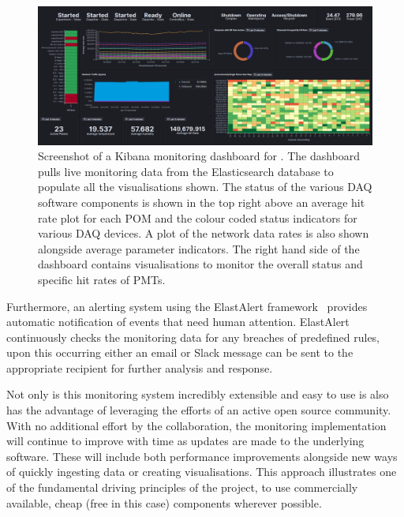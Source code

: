 \begin{figure} %
    \includegraphics[width=\textwidth]{diagrams/5-daq/monitoring.pdf}
    \caption[Screenshot of a Kibana monitoring dashboard for \chipsfive]
    {Screenshot of a Kibana monitoring dashboard for \chipsfive. The dashboard pulls live
    monitoring data from the Elasticsearch database to populate all the visualisations shown. The
    status of the various DAQ software components is shown in the top right above an average hit
    rate plot for each POM and the colour coded status indicators for various DAQ devices. A plot
    of the network data rates is also shown alongside average parameter indicators. The right hand
    side of the dashboard contains visualisations to monitor the overall status and specific hit
    rates of PMTs.}
    \label{fig:monitoring}
\end{figure}

Furthermore, an alerting system using the ElastAlert framework~\cite{elastalert2020} provides
automatic notification of events that need human attention. ElastAlert continuously checks the
monitoring data for any breaches of predefined rules, upon this occurring either an email or Slack
message can be sent to the appropriate recipient for further analysis and response.

Not only is this monitoring system incredibly extensible and easy to use is also has the advantage
of leveraging the efforts of an active open source community. With no additional effort by the
\chips collaboration, the monitoring implementation will continue to improve with time as updates
are made to the underlying software. These will include both performance improvements alongside
new ways of quickly ingesting data or creating visualisations. This approach illustrates one of
the fundamental driving principles of the \chips project, to use commercially available, cheap
(free in this case) components wherever possible.